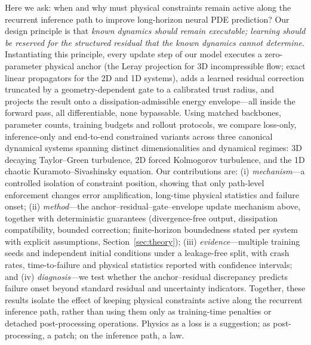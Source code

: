 \documentclass[11pt,a4paper]{article}
\begin{document}
Here we ask: when and why must physical constraints remain active along the recurrent inference path to improve long-horizon neural PDE prediction? Our design principle is that \emph{known dynamics should remain executable; learning should be reserved for the structured residual that the known dynamics cannot determine}. Instantiating this principle, every update step of our model executes a zero-parameter physical anchor (the Leray projection for 3D incompressible flow; exact linear propagators for the 2D and 1D systems), adds a learned residual correction truncated by a geometry-dependent gate to a calibrated trust radius, and projects the result onto a dissipation-admissible energy envelope---all inside the forward pass, all differentiable, none bypassable. Using matched backbones, parameter counts, training budgets and rollout protocols, we compare loss-only, inference-only and end-to-end constrained variants across three canonical dynamical systems spanning distinct dimensionalities and dynamical regimes: 3D decaying Taylor--Green turbulence, 2D forced Kolmogorov turbulence, and the 1D chaotic Kuramoto--Sivashinsky equation. Our contributions are: (i) \emph{mechanism}---a controlled isolation of constraint position, showing that only path-level enforcement changes error amplification, long-time physical statistics and failure onset; (ii) \emph{method}---the anchor--residual--gate--envelope update mechanism above, together with deterministic guarantees (divergence-free output, dissipation compatibility, bounded correction; finite-horizon boundedness stated per system with explicit assumptions, Section~\ref{sec:theory}); (iii) \emph{evidence}---multiple training seeds and independent initial conditions under a leakage-free split, with crash rates, time-to-failure and physical statistics reported with confidence intervals; and (iv) \emph{diagnosis}---we test whether the anchor--residual discrepancy predicts failure onset beyond standard residual and uncertainty indicators. Together, these results isolate the effect of keeping physical constraints active along the recurrent inference path, rather than using them only as training-time penalties or detached post-processing operations. Physics as a loss is a suggestion; as post-processing, a patch; on the inference path, a law.
\end{document}
